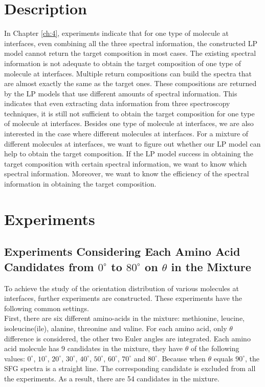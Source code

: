  \label{ch:5}
\section{Description}

In Chapter \ref{ch:4}, experiments indicate that for one type of molecule at interfaces, even combining all the three spectral information, the constructed LP model cannot return the target composition in most cases. The existing spectral information is not adequate to obtain the target composition of one type of molecule at interfaces. Multiple return compositions can build the spectra that are almost exactly the same as the target ones. These compositions are returned by the LP models that use different amounts of spectral information. This indicates that even extracting data information from three spectroscopy techniques, it is still not sufficient to obtain the target composition for one type of molecule at interfaces. Besides one type of molecule at interfaces, we are also interested in the case where different molecules at interfaces. For a mixture of different molecules at interfaces, we want to figure out whether our LP model can help to obtain the target composition. If the LP model success in obtaining the target composition with certain spectral information, we want to know which spectral information. Moreover, we want to know the efficiency of the spectral information in obtaining the target composition. \\

\section{Experiments}
\subsection{Experiments Considering Each Amino Acid Candidates from $0^{\circ}$ to $80^{\circ}$ on $\theta$ in the Mixture}
To achieve the study of the orientation distribution of various molecules at interfaces, further experiments are constructed. These experiments have the following common settings. \\

First, there are six different amino-acids in the mixture: methionine, leucine, isoleucine(ile), alanine, threonine and valine. For each amino acid, only $\theta$ difference is considered, the other two Euler angles are integrated. Each amino acid molecule has 9 candidates in the mixture, they have $\theta$ of the following values: $0^{\circ}$,  $10^{\circ}$, $20^{\circ}$, $30^{\circ}$, $40^{\circ}$, $50^{\circ}$, $60^{\circ}$, $70^{\circ}$ and $80^{\circ}$. Because when $\theta$ equals $90^{\circ}$, the SFG spectra is a straight line. The corresponding candidate is excluded from all the experiments. As a result, there are 54 candidates in the mixture. \\

